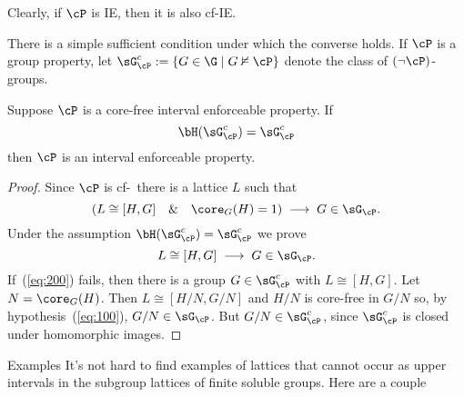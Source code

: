\begin{frame}[label=IEProps]{}
Clearly, if $\cP$ is IE, then it is also cf-IE.
\vskip4mm

There is a simple sufficient condition under which the converse holds.
\vskip4mm
If $\cP$ is a group property, let
$\sG_{\cP}^c := \{G\in \G \mid G\nvDash \cP\}$
denote the class of $(\neg \cP)$-groups.

\begin{lemma}
\label{lemma-wjd-2}
Suppose $\cP$ is a core-free interval enforceable property.  
If 
\[
\bH(\sG_{\cP}^c) = \sG_{\cP}^c
\]
then $\cP$ is an interval enforceable property.
\end{lemma}
\end{frame}

\begin{frame}[label=IEPropsProof]{}
\begin{proof}
Since $\cP$ is cf-\IE\ there is a lattice $L$ such that
\begin{equation}
  \label{eq:100}
\left(L \cong [H,G] \quad \& \quad \core_G(H)=1\right) \; \longrightarrow \; G\in \sG_\cP.
\end{equation}
Under the assumption $\bH(\sG_\cP^c) = \sG_\cP^c$ we prove
\begin{equation}
  \label{eq:200}
L \cong [H,G] \; \longrightarrow \; G\in \sG_\cP.
\end{equation}
If~(\ref{eq:200}) fails, then there is a
group $G\in \sG_{\cP}^c$ with $L\cong [H,G]$.  Let $N = \core_G(H)$.  Then $L \cong
[H/N,G/N]$ and $H/N$ is core-free in $G/N$ so, by hypothesis~(\ref{eq:100}),
$G/N \in \sG_\cP$.  But $G/N \in \sG_{\cP}^c$, since $\sG_{\cP}^c$ is closed under homomorphic images.
\end{proof}
\end{frame}

\begin{frame}[label=IEPropsInsoluble]{Examples}
\vskip2mm
It's not hard to find examples of lattices that cannot occur as
upper intervals in the subgroup lattices of finite soluble groups.
\vskip4mm
Here are a couple
\vskip1cm
\begin{columns}
    \begin{column}{0.2\textwidth}
        \begin{tikzpicture}[scale=.5]
          
        \end{tikzpicture}
    \end{column}
    \begin{column}{0.2\textwidth}
        \begin{tikzpicture}[scale=.5]
          
        \end{tikzpicture}
    \end{column}
\end{columns}
\end{frame}


